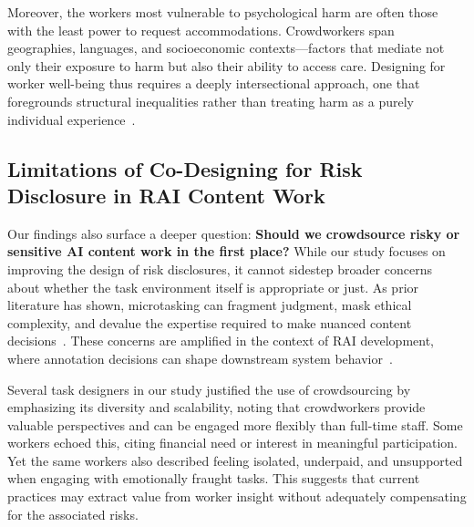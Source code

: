 Moreover, the workers most vulnerable to psychological harm are often those with the least power to request accommodations. Crowdworkers span geographies, languages, and socioeconomic contexts—factors that mediate not only their exposure to harm but also their ability to access care. Designing for worker well-being thus requires a deeply intersectional approach, one that foregrounds structural inequalities rather than treating harm as a purely individual experience~\cite{miceli2022data}.

\subsection{Limitations of Co-Designing for Risk Disclosure in RAI Content Work}

Our findings also surface a deeper question: \textbf{Should we crowdsource risky or sensitive AI content work in the first place?} While our study focuses on improving the design of risk disclosures, it cannot sidestep broader concerns about whether the task environment itself is appropriate or just. As prior literature has shown, microtasking can fragment judgment, mask ethical complexity, and devalue the expertise required to make nuanced content decisions~\cite{berg2018digital}. These concerns are amplified in the context of RAI development, where annotation decisions can shape downstream system behavior~\cite{wang2022whose, diaz2022crowdworksheets}.

Several task designers in our study justified the use of crowdsourcing by emphasizing its diversity and scalability, noting that crowdworkers provide valuable perspectives and can be engaged more flexibly than full-time staff. Some workers echoed this, citing financial need or interest in meaningful participation. Yet the same workers also described feeling isolated, underpaid, and unsupported when engaging with emotionally fraught tasks. This suggests that current practices may extract value from worker insight without adequately compensating for the associated risks. 

